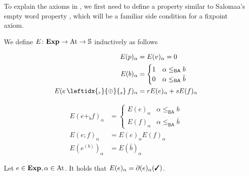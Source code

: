 \documentclass[a4paper,UKenglish,cleveref, autoref, thm-restate]{lipics-v2021}
\newcommand{\cmark}{\text{\ding{51}}}
\newcommand{\At}{\text{\upshape{At}}}
\newcommand{\Exp}{\textbf{\upshape{Exp}}}
\newcommand{\BA}{\textsf{BA}}
\newcommand{\WC}[2]{\,\leftidx{_{#1}}{{\oplus}}{_{#2}}\,}
\theoremstyle{plain}\newtheoremrep{thm}{Theorem}[section]
\begin{document}
	To explain the axioms in , we first need to define a property similar to Salomaa's empty word property \cite{salomaa}, which will be a familiar side condition for a fixpoint axiom.	
	\begin{defn}
		We define $E\colon \Exp \to \At \to \mathbb S$ inductively as follows
		
		\begin{minipage}[t]{0.45\textwidth}\vspace{-.65cm}
			\begin{align*}
				E(p)_\alpha &= E(v)_\alpha = 0\\
				E(b)_\alpha &= \begin{cases}1 &\alpha \leq_{\BA} b\\ 0 & \alpha \leq_{\BA} \bar b \end{cases}\\
				E(e \WC{r}{s} f)_\alpha &= rE(e)_\alpha+sE(f)_\alpha
			\end{align*}
		\end{minipage}
		\begin{minipage}[t]{0.45\textwidth}\vspace{-.65cm}
			\begin{align*}
				E(e +_b f)_\alpha &= \begin{cases}E(e)_\alpha &\alpha \leq_{\BA} b\\ E(f)_\alpha & \alpha \leq_{\BA} \bar b \end{cases}\\
				E(e;f)_\alpha &= E(e)_\alpha E(f)_\alpha\\
				E(e^{(b)})_\alpha &= E(\bar b)_\alpha
			\end{align*}
		\end{minipage}
	\end{defn}
	\begin{lemrep}
		Let $e \in \Exp, \alpha \in \At$. It holds that $E(e)_\alpha = \partial(e)_\alpha(\cmark)$\label{lem44}.
	\end{lemrep}
\end{document}
